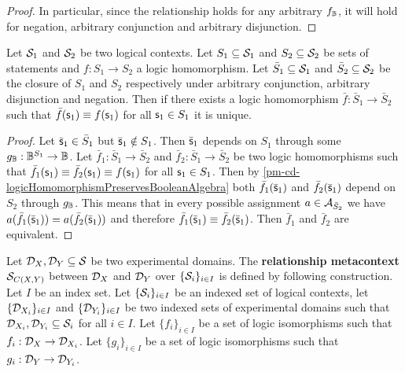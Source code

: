 \begin{mathSection}
\begin{proof}
		In particular, since the relationship holds for any arbitrary $f_\Bool$, it will hold for negation, arbitrary conjunction and arbitrary disjunction.
	\end{proof}
	
	\begin{prop}
		Let $\logCtx_1$ and $\logCtx_2$ be two logical contexts. Let $S_1 \subseteq \logCtx_1$ and $S_2 \subseteq \logCtx_2$ be sets of statements and $f : S_1 \to S_2$ a logic homomorphism. Let $\bar{S}_1 \subseteq \logCtx_1$ and $\bar{S}_2 \subseteq \logCtx_2$ be the closure of $S_1$ and $S_2$ respectively under arbitrary conjunction, arbitrary disjunction and negation. Then if there exists a logic homomorphism $\bar{f} : \bar{S}_1 \to \bar{S}_2$ such that $\bar{f}(\stmt_1) \equiv f(\stmt_1)$ for all $\stmt_1 \in S_1$ it is unique.
	\end{prop}
	
	\begin{proof}
		Let $\tstmt_1 \in \bar{S}_1$ but $\tstmt_1 \notin S_1$. Then $\tstmt_1$ depends on $S_1$ through some $g_\Bool : \Bool^{S_1} \to \Bool$. Let $\bar{f}_1 : \bar{S}_1 \to \bar{S}_2$ and $\bar{f}_2 : \bar{S}_1 \to \bar{S}_2$ be two logic homomorphisms such that $\bar{f}_1(\stmt_1) \equiv \bar{f}_2(\stmt_1) \equiv f(\stmt_1)$ for all $\stmt_1 \in S_1$. Then by \ref{pm-cd-logicHomomorphismPreservesBooleanAlgebra} both $\bar{f}_1(\tstmt_1)$ and $\bar{f}_2(\tstmt_1)$ depend on $S_2$ through $g_\Bool$. This means that in every possible assignment $a \in \pAss[\bar{S}_2]$ we have $a(\bar{f}_1(\tstmt_1)) = a(\bar{f}_2(\tstmt_1))$  and therefore $\bar{f}_1(\tstmt_1) \equiv \bar{f}_2(\tstmt_1)$. Then $\bar{f}_1$ and $\bar{f}_2$ are equivalent.
	\end{proof}
	
	
	\begin{defn}
		Let $\edomain_X, \edomain_Y \subseteq \logCtx$ be two experimental domains. The \textbf{relationship metacontext}  $\logCtx_{C(X,Y)}$ between $\edomain_X$ and $\edomain_Y$ over $\{ \logCtx_i \}_{i \in I}$ is defined by following construction. Let $I$ be an index set. Let $\{ \logCtx_i \}_{i \in I}$ be an indexed set of logical contexts, let $\{ \edomain_{X_i} \}_{i \in I}$ and $\{ \edomain_{Y_i} \}_{i \in I}$ be two indexed sets of experimental domains such that $\edomain_{X_i}, \edomain_{Y_i} \subseteq \logCtx_i$ for all $i \in I$. Let $\{f_{i}\}_{i \in I}$ be a set of logic isomorphisms such that $f_{i} : \edomain_{X} \to \edomain_{X_i}$. Let $\{g_{i}\}_{i \in I}$ be a set of logic isomorphisms such that $g_{i} : \edomain_{Y} \to \edomain_{Y_i}$.
		

\end{defn}
\end{mathSection}

